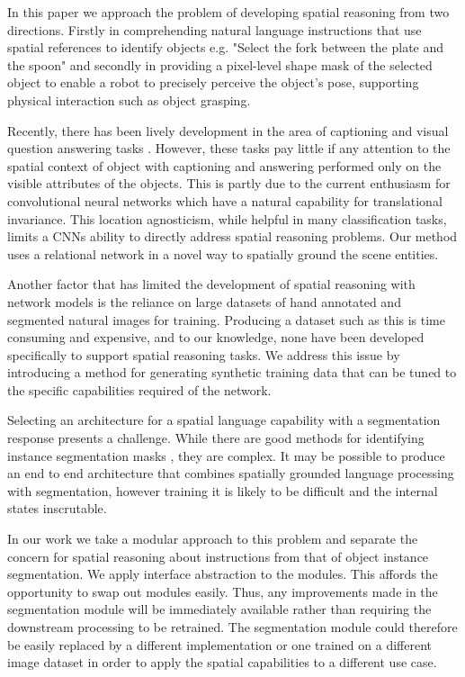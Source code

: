 \documentclass[conference]{IEEEtran}
\begin{document}
In this paper we approach the problem of developing spatial reasoning from two directions.  Firstly in comprehending natural language instructions that use spatial references to identify objects e.g. "Select the fork between the plate and the spoon" and secondly in providing a pixel-level shape mask of the selected object to enable a robot to precisely perceive the object's pose, supporting physical interaction such as object grasping. 

Recently, there has been lively development in the area of captioning and visual question answering tasks \cite{RN67, RN82}. However, these tasks pay little if any attention to the spatial context of object with captioning and answering performed only on the visible attributes of the objects.  This is partly due to the current enthusiasm for convolutional neural networks which have a natural capability for translational invariance.  This location agnosticism, while helpful in many classification tasks, limits a CNNs ability to directly address spatial reasoning problems.  Our method uses a relational network \cite{RN1} in a novel way to spatially ground the scene entities. 

Another factor that has limited the development of spatial reasoning with network models is the reliance on large datasets of hand annotated and segmented natural images for training\cite{RN73,RN93}.  Producing a dataset such as this is time consuming and expensive, and to our knowledge, none have been developed specifically to support spatial reasoning tasks. We address this issue by introducing a method for generating synthetic training data that can be tuned to the specific capabilities required of the network. 

Selecting an architecture for a spatial language capability with a segmentation response presents a challenge.  While there are good methods for identifying instance segmentation masks \cite{RN62,RN91}, they are complex.  It may be possible to produce an end to end architecture that combines spatially grounded language processing with segmentation, however training it is likely to be difficult and the internal states inscrutable. 

In our work we take a modular approach to this problem and separate the concern for spatial reasoning about instructions from that of object instance segmentation.  We apply interface abstraction to the modules. This affords the opportunity to swap out modules easily.  Thus, any improvements made in the segmentation module will be immediately available rather than requiring the downstream processing to be retrained.  The segmentation module could therefore be easily replaced by a different implementation or one trained on a different image dataset in order to apply the spatial capabilities to a different use case. 
\end{document}
